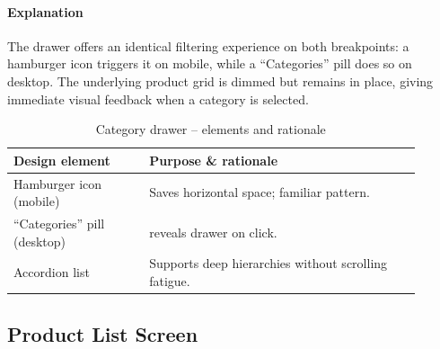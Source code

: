 \documentclass[11pt,a4paper]{article}
\begin{document}
\paragraph{Explanation}%
The drawer offers an identical filtering experience on both breakpoints:
a hamburger icon triggers it on mobile, while a “Categories” pill does so on
desktop. The underlying product grid is dimmed but remains in place, giving
immediate visual feedback when a category is selected.

\begin{table}[H]
	\centering
	\caption{Category drawer – elements and rationale}
	\label{tab:category-elements}
	\begin{tabular}{p{0.30\linewidth} p{0.60\linewidth}}
		\toprule
		\textbf{Design element} & \textbf{Purpose \& rationale} \\ \midrule

		Hamburger icon (mobile) & Saves horizontal space; familiar pattern. \\
		“Categories” pill (desktop) & reveals drawer on click. \\
		Accordion list          & Supports deep hierarchies without scrolling fatigue. \\
	
		\bottomrule
	\end{tabular}
\end{table}
\subsection{Product List Screen}
\end{document}
